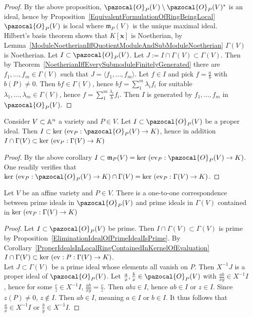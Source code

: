 \begin{proof}
   By the above proposition, $\pazocal{O}_P(V)\setminus \pazocal{O}_P(V)^\ast$ is an ideal, hence by Proposition~\ref{EquivalentFormulationOfRingBeingLocal} $\pazocal{O}_P(V)$ is local where $\mathfrak{m}_P(V)$ is the unique maximal ideal.\\
   Hilbert's basis theorem shows that $K[\mathbf{x}]$ is Noetherian, by Lemma~\ref{ModuleNoetherianIffQuotientModuleAndSubModuleNoetherian} $\Gamma(V)$ is Noetherian. Let $I\subset \pazocal{O}_P(V)$. Let $J:= I\cap \Gamma(V) \subset \Gamma(V)$. Then by Theorem~\ref{NoetherianIffEverySubmoduleFinitelyGenerated} there are $f_1,\dots,f_m\in \Gamma(V)$ such that $J = \langle f_1,\dots,f_m\rangle$. Let $f\in I$ and pick $f=\frac{a}{b}$ with $b(P)\neq 0$. Then $bf\in\Gamma(V)$, hence $bf = \sum_1^m \lambda_if_i$ for suitable $\lambda_1,\dots,\lambda_m\in \Gamma(V)$, hence $f = \sum_1^m \frac{\lambda_i}{b}f_i$. Then $I$ is generated by $f_1,\dots,f_m$ in $\pazocal{O}_P(V).$
\end{proof}
\begin{corollary}\label{ProperIdealsInLocalRingContainedInKernelOfEvaluation}
    Consider $V\subset \mathbb{A}^n$ a variety and $P\in V$. Let $I\subset \pazocal{O}_P(V)$ be a proper ideal. Then $I\subset \ker \ (\ev_P : \pazocal{O}_P(V) \rightarrow K)$, hence in addition $I\cap \Gamma(V)\subset \ker \ (\mathrm{ev}_P : \Gamma(V)\rightarrow K)$
\end{corollary}
\begin{proof}
    By the above corollary $I\subset \mathfrak{m}_P(V) = \ker \ (\ev_P : \pazocal{O}_P(V) \rightarrow K)$. One readily verifies that $ \ker \ (\ev_P : \pazocal{O}_P(V) \rightarrow K) \cap \Gamma(V)= \ker\ (\ev_P:\Gamma(V) \rightarrow K)$.
\end{proof}
\begin{lemma}
    Let $V$ be an affine variety and $P\in V$. There is a one-to-one correspondence between prime ideals in $\pazocal{O}_P(V)$ and prime ideals in $\Gamma(V)$ contained in $\ker\ (\mathrm{ev}_P: \Gamma(V) \rightarrow K)$
\end{lemma}
\begin{proof}
    Let $I \subset \pazocal{O}_P(V)$ be prime. Then $I\cap \Gamma(V)\subset \Gamma(V)$ is prime by Proposition~\ref{EliminationIdealOfPrimeIdealIsPrime}. By Corollary~\ref{ProperIdealsInLocalRingContainedInKernelOfEvaluation} $I\cap \Gamma(V)\subset \ker\ (\mathrm{ev}:P: \Gamma(V)\rightarrow K)$.\\
    Let $J\subset \Gamma(V)$ be a prime ideal whose elements all vanish on $P$. Then $X^{-1}J$ is a proper ideal of $\pazocal{O}_P(V)$. Let $\frac{a}{x},\frac{b}{x}\in \pazocal{O}_P(V)$ with $\frac{ab}{xy}\in X^{-1}I$, hence for some $\frac{c}{z}\in X^{-1}I$, $\frac{ab}{xy}=\frac{c}{z}$. Then $abz\in I$, hence $ab\in I$ or $z\in I$. Since $z(P)\neq 0$, $z\notin I$. Then $ab\in I$, meaning $a\in I$ or $b\in I$. It thus follows that $\frac{a}{x}\in X^{-1}I$ or $\frac{b}{y}\in X^{-1}I$.
\end{proof}
